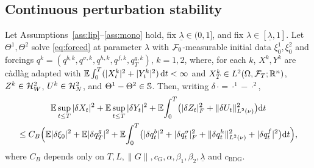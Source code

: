 \subsection{Continuous perturbation stability}

\begin{lemma}\label{lem:pert}
Let Assumptions~\ref{ass:lip}--\ref{ass:mono} hold, fix $\underline\lambda\in(0,1]$, and
fix $\lambda\in[\underline\lambda,1]$. Let
$\Theta^1,\Theta^2$ solve \eqref{eq:forced} at parameter $\lambda$ with $\mathcal{F}_0$-measurable
initial data $\xi_0^1,\xi_0^2$ and forcings
$q^k=(q^{b,k},q^{\sigma,k},q^{h,k},q^{f,k},q^{g,k}_T)$, $k=1,2$, where, for each $k$,
$X^k,Y^k$ are c\`adl\`ag adapted with
$\mathbb{E}\int_0^T(|X^k_t|^2+|Y^k_t|^2)\,\mathrm{d} t<\infty$ and $X^k_T\in L^2(\Omega,\mathcal{F}_T;\mathbb{R}^n)$,
$Z^k\in\mathcal{H}^2_W$, $U^k\in\mathcal{H}^2_N$, and $\Theta^1-\Theta^2\in\mathbb{S}$. Then, writing
$\delta\,{\cdot}={\cdot}^1-{\cdot}^2$,
\begin{multline}\label{eq:contpert}
\mathbb{E}\sup_{t\le T}|\delta X_t|^2+\mathbb{E}\sup_{t\le T}|\delta Y_t|^2
+\mathbb{E}\!\int_0^T\!\big(|\delta Z_t|_F^2+\lVert \delta U_t\rVert_{L^2(\nu)}^2\big)\mathrm{d} t\\
\le C_B\Big(\mathbb{E}|\delta\xi_0|^2+\mathbb{E}|\delta q^g_T|^2
+\mathbb{E}\!\int_0^T\!\big(|\delta q^b_t|^2+|\delta q^\sigma_t|_F^2
+\lVert \delta q^h_t\rVert_{L^2(\nu)}^2+|\delta q^f_t|^2\big)\mathrm{d} t\Big),
\end{multline}
where $C_B$ depends only on
$T,L,\|G\|,c_G,\alpha,\beta_1,\beta_2,\underline\lambda$ and $c_{\mathrm{BDG}}$.
\end{lemma}

